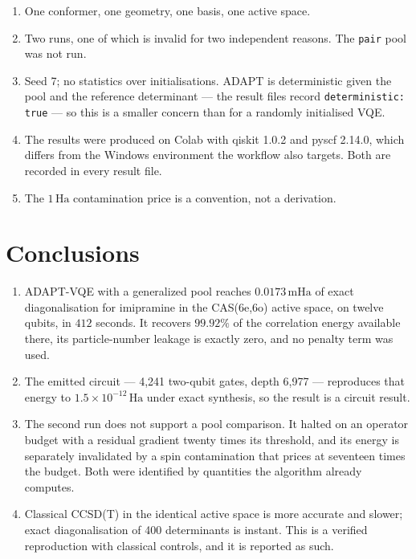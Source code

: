 \documentclass[11pt,a4paper]{article}
\newcommand{\mHa}{\ensuremath{\,\mathrm{mHa}}}
\newcommand{\Ha}{\ensuremath{\,\mathrm{Ha}}}
\newcommand{\code}[1]{\texttt{\small #1}}
\begin{document}
\begin{enumerate}[leftmargin=1.4em,itemsep=0.2em]
\item One conformer, one geometry, one basis, one active space.
\item Two runs, one of which is invalid for two independent reasons. The
  \code{pair} pool was not run.
\item Seed 7; no statistics over initialisations. ADAPT is deterministic given
  the pool and the reference determinant --- the result files record
  \code{deterministic: true} --- so this is a smaller concern than for a
  randomly initialised VQE.
\item The results were produced on Colab with qiskit 1.0.2 and pyscf 2.14.0,
  which differs from the Windows environment the workflow also targets. Both are
  recorded in every result file.
\item The $1\Ha$ contamination price is a convention, not a derivation.
\end{enumerate}

\section{Conclusions}

\sloppy
\begin{enumerate}[leftmargin=1.4em,itemsep=0.25em]

\item ADAPT-VQE with a generalized pool reaches $0.0173\mHa$ of exact
  diagonalisation for imipramine in the CAS(6e,6o) active space, on twelve
  qubits, in $412$ seconds. It recovers $99.92\%$ of the correlation energy
  available there, its particle-number leakage is exactly zero, and no penalty
  term was used.

\item The emitted circuit --- 4{,}241 two-qubit gates, depth 6{,}977 ---
  reproduces that energy to $1.5\times10^{-12}\Ha$ under exact synthesis, so the
  result is a circuit result.

\item The second run does not support a pool comparison. It halted on an
  operator budget with a residual gradient twenty times its threshold, and its
  energy is separately invalidated by a spin contamination that prices at
  seventeen times the budget. Both were identified by quantities the algorithm
  already computes.

\item Classical CCSD(T) in the identical active space is more accurate and
  slower; exact diagonalisation of 400 determinants is instant. This is a
  verified reproduction with classical controls, and it is reported as such.

\end{enumerate}
\fussy
\end{document}
